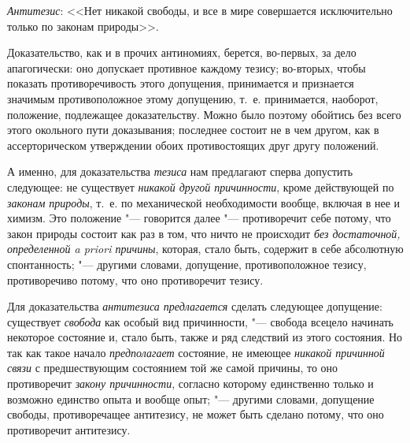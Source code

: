 {\em Антитезис}: <<Нет
никакой свободы, и все в мире совершается исключительно только по законам
природы>>.

Доказательство, как и в прочих антиномиях, берется, во-первых,
за дело апагогически: оно допускает противное каждому тезису; во-вторых,
чтобы показать противоречивость этого допущения, принимается и признается
значимым противоположное этому допущению, т.~е. принимается, наоборот,
положение, подлежащее доказательству. Можно было поэтому обойтись без всего
этого окольного пути доказывания; последнее состоит не в чем другом, как в
ассерторическом утверждении обоих противостоящих друг другу положений.

А именно, для доказательства
{\em тезиса} нам
предлагают сперва допустить следующее: не существует
{\em никакой другой причинности},
кроме действующей по
{\em законам природы},
т.~е. по механической необходимости вообще, включая в нее и
химизм. Это положение "--- говорится далее
"--- противоречит себе потому, что закон природы состоит как раз
в том, что ничто не происходит {\em без
достаточной, определенной a priori причины}, которая, стало
быть, содержит в себе абсолютную спонтанность; "--- другими
словами, допущение, противоположное тезису, противоречиво потому, что оно
противоречит тезису.

Для доказательства
{\em антитезиса предлагается}
сделать следующее допущение: существует
{\em свобода} как особый
вид причинности, "--- свобода всецело начинать некоторое
состояние и, стало быть, также и ряд следствий из этого состояния. Но так
как такое начало {\em предполагает}
состояние, не имеющее
{\em никакой причинной связи}
с предшествующим состоянием той же самой причины, то оно
противоречит {\em закону причинности},
согласно которому единственно только и возможно единство
опыта и вообще опыт; "--- другими словами, допущение свободы,
противоречащее антитезису, не может быть сделано потому, что оно
противоречит антитезису.

